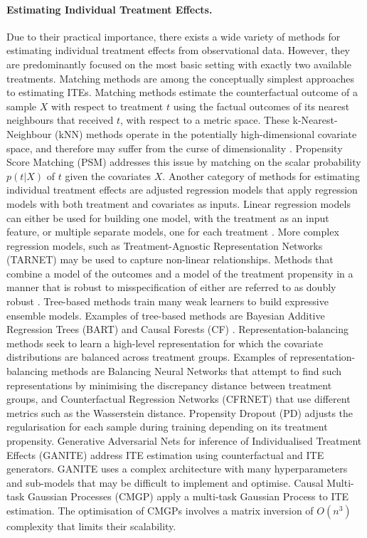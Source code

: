 \documentclass{article}
\begin{document}
\paragraph{Estimating Individual Treatment Effects.} Due to their practical importance, there exists a wide variety of methods for estimating individual treatment effects from observational data. However, they are predominantly focused on the most basic setting with exactly two available treatments. Matching methods are among the conceptually simplest approaches to estimating ITEs. Matching methods estimate the counterfactual outcome of a sample $X$ with respect to treatment $t$ using the factual outcomes of its nearest neighbours that received $t$, with respect to a metric space. These k-Nearest-Neighbour (kNN) methods \cite{ho2007matching} operate in the potentially high-dimensional covariate space, and therefore may suffer from the {curse of dimensionality} \cite{indyk1998approximate}. Propensity Score Matching (PSM) \cite{rosenbaum1983propensity} addresses this issue by matching on the scalar probability $p(t|X)$ of $t$ given the covariates $X$. Another category of methods for estimating individual treatment effects are adjusted regression models that apply regression models with both treatment and covariates as inputs. Linear regression models can either be used for building one model, with the treatment as an input feature, or multiple separate models, one for each treatment \cite{kallus2017recursive}. More complex regression models, such as Treatment-Agnostic Representation Networks (TARNET) \cite{shalit2016estimating} may be used to capture non-linear relationships. Methods that combine a model of the outcomes and a model of the treatment propensity in a manner that is robust to misspecification of either are referred to as {doubly robust} \cite{funk2011doubly}. Tree-based methods train many weak learners to build expressive ensemble models. Examples of tree-based methods are Bayesian Additive Regression Trees (BART) \cite{chipman2010bart,chipman2016bayestree} and Causal Forests (CF) \cite{wager2017estimation}. Representation-balancing methods seek to learn a high-level representation for which the covariate distributions are balanced across treatment groups. Examples of representation-balancing methods are Balancing Neural Networks \cite{johansson2016learning} that attempt to find such representations by minimising the {discrepancy distance} \cite{mansour2009domain} between treatment groups, and Counterfactual Regression Networks (CFRNET) \cite{shalit2016estimating} that use different metrics such as the Wasserstein distance. Propensity Dropout (PD) \cite{alaa2017deep} adjusts the regularisation for each sample during training depending on its treatment propensity. Generative Adversarial Nets for inference of Individualised Treatment Effects (GANITE) \cite{yoon2018ganite} address ITE estimation using counterfactual and ITE generators. GANITE uses a complex architecture with many hyperparameters and sub-models that may be difficult to implement and optimise. Causal Multi-task Gaussian Processes (CMGP) \cite{alaa2017bayesian} apply a multi-task Gaussian Process to ITE estimation. The optimisation of CMGPs involves a matrix inversion of $O(n^3)$ complexity that limits their scalability. 
\end{document}
